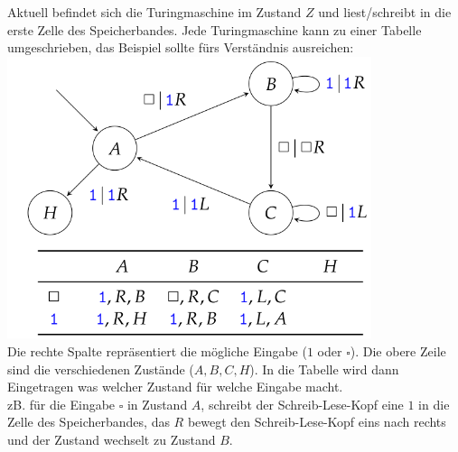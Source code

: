 \documentclass[12pt]{article}
\begin{document}
\begin{flushleft}
    Aktuell befindet sich die Turingmaschine im Zustand $Z$ und liest/schreibt in die erste Zelle des Speicherbandes.
    \linebreak \linebreak
    Jede Turingmaschine kann zu einer Tabelle umgeschrieben, das Beispiel sollte fürs Verständnis ausreichen:
    \includegraphics[width=0.8\textwidth]{turing_table.png} \\
    Die rechte Spalte repräsentiert die mögliche Eingabe ($1$ oder $\square$). Die obere Zeile sind die verschiedenen Zustände ($A,B,C,H$).
    In die Tabelle wird dann Eingetragen was welcher Zustand für welche Eingabe macht. \\
    zB. für die Eingabe $\square$ in Zustand $A$, schreibt der Schreib-Lese-Kopf eine $1$ in die Zelle des Speicherbandes, das $R$ bewegt den Schreib-Lese-Kopf eins nach rechts und der Zustand wechselt zu Zustand $B$.
\end{flushleft}
\end{document}
